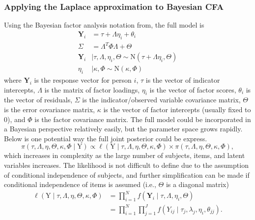 \documentclass[man, noextraspace, floatsintext, 12pt]{apa7}
\begin{document}
\subsubsection{Applying the Laplace approximation to Bayesian CFA}

Using the Bayesian factor analysis notation from\textcite{Levy2013}, the full model is
\begin{align} \label{eq:cfa}
\mathbf{Y}_i &= \tau + \Lambda \eta_i + \theta_i\\
\Sigma &= \Lambda^T \Phi \Lambda + \Theta \nonumber\\
\mathbf{Y}_i &\mid \tau, \Lambda, \eta_i, \Theta \sim \mathrm{N}\left(\tau + \Lambda \eta_i, \Theta \right) \nonumber \\
\eta_i &\mid \kappa, \Phi \sim \mathrm{N}\left(\kappa, \Phi \right) \nonumber
\end{align}
where $\mathbf{Y}_i$ is the response vector for person $i$, $\tau$ is the vector of indicator intercepts, $\Lambda$ is the matrix of factor loadings, $\eta_i$ is the vector of factor scores, $\theta_i$ is the vector of residuals, $\Sigma$ is the indicator/observed variable covariance matrix, $\Theta$ is the error covariance matrix, $\kappa$ is the vector of factor intercepts (usually fixed to 0), and $\Phi$ is the factor covariance matrix.
The full model could be incorporated in a Bayesian perspective relatively easily, but the parameter space grows rapidly.
Below is one potential way the full joint posterior could be express.
\begin{equation} \label{eg:post}
\pi\left(\tau, \Lambda, \eta,\Theta, \kappa, \Phi\mid \mathrm{Y}\right) \propto \ell\left(\mathrm{Y} \mid \tau, \Lambda, \eta,\Theta, \kappa, \Phi\right) \times \pi\left(\tau, \Lambda, \eta,\Theta, \kappa, \Phi\right),
\end{equation}
which increases in complexity as the large number of subjects, items, and latent variables increases.
The likelihood is not difficult to define due to the assumption of conditional independence of subjects, and further simplification can be made if conditional independence of items is assumed (i.e., $\Theta$ is a diagonal matrix)
\begin{align*}
\ell\left(\mathrm{Y} \mid \tau, \Lambda, \eta,\Theta, \kappa, \Phi\right) &= \prod_{i=1}^{N} f\left(\mathbf{Y}_i \mid \tau, \Lambda, \eta_i, \Theta \right)\\
 &=\prod_{i=1}^{N} \prod_{j=1}^{J}f\left(Y_{ij} \mid \tau_j, \lambda_{j}, \eta_i, \theta_{jj} \right).
\end{align*}
\end{document}
